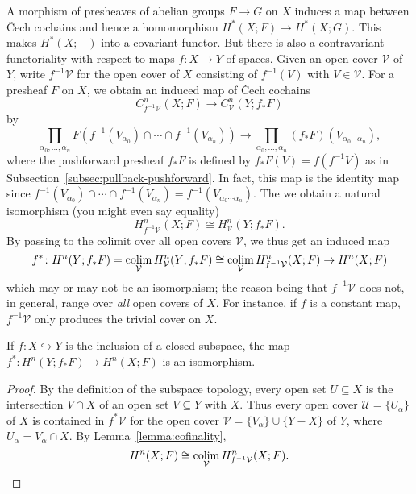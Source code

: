 \documentclass[a4paper,openany]{scrbook}
\begin{document}
A morphism of presheaves of abelian groups $F \to G$ on $X$ induces a map between \v Cech cochains and hence a homomorphism $H^*(X;F) \to H^*(X;G)$. This makes $H^*(X;-)$ into a covariant functor. But there is also a contravariant functoriality with respect to maps $f\colon X \to Y$ of spaces. Given an open cover $\mathcal V$ of $Y$, write $f^{-1}\mathcal V$ for the open cover of $X$ consisting of $f^{-1}(V)$ with $V \in \mathcal V$. For a presheaf $F$ on $X$, we obtain an induced map of \v Cech cochains
\[
C^n_{f^{-1}\mathcal V}(X;F) \to C^n_{\mathcal V}(Y;f_*F)
\]
by
\[
\prod_{\alpha_0,\dots,\alpha_n} F(f^{-1}(V_{\alpha_0}) \cap \cdots \cap f^{-1}(V_{\alpha_n})) \to \prod_{\alpha_0,\dots,\alpha_n} (f_*F)(V_{\alpha_0\cdots\alpha_n}),
\]
where the pushforward presheaf $f_*F$ is defined by $f_*F(V)=f(f^{-1}V)$ as in Subsection~\ref{subsec:pullback-pushforward}. In fact, this map is the identity map since $f^{-1}(V_{\alpha_0}) \cap \cdots \cap f^{-1}(V_{\alpha_n}) = f^{-1}(V_{\alpha_0\cdots\alpha_n})$.
The we obtain a natural isomorphism (you might even say equality)
\[
H_{f^{-1}\mathcal V}^n(X;F) \cong H_{\mathcal V}^n(Y;f_*F).
\]
By passing to the colimit over all open covers $\mathcal V$, we thus get an induced map
\begin{equation}\label{eq:inducedmaponcohomology}
f^*\colon H^n(Y;f_*F) =\operatorname*{colim}_{\mathcal V} H^n_{\mathcal V}(Y;f_*F) \cong \operatorname*{colim}_{\mathcal V} H^n_{f^{-1}\mathcal V}(X;F) \to  H^n(X;F)
\end{equation}
which may or may not be an isomorphism; the reason being that $f^{-1}\mathcal V$ does not, in general, range over \emph{all} open covers of $X$. For instance, if $f$ is a constant map, $f^{-1}\mathcal V$ only produces the trivial cover on $X$.

\begin{lemma}\label{lemma:basechangeiso}
If $f\colon X \hookrightarrow Y$ is the inclusion of a closed subspace, the map $f^*\colon H^n(Y;f_*F) \to H^n(X;F)$ is an isomorphism.
\end{lemma}
\begin{proof}
By the definition of the subspace topology, every open set $U \subseteq X$ is the intersection $V \cap X$ of an open set $V \subseteq Y$ with $X$. Thus every open cover $\mathcal U = \{U_\alpha\}$ of $X$ is contained in $f^*\mathcal V$ for the open cover $\mathcal V = \{V_\alpha\} \cup \{Y-X\}$ of $Y$, where $U_\alpha = V_\alpha \cap X$. By Lemma~\ref{lemma:cofinality},
\[
H^n(X;F) \cong \operatorname*{colim}_{\mathcal V}H^n_{f^{-1}\mathcal V}(X;F).
\]
\end{proof}
\end{document}
